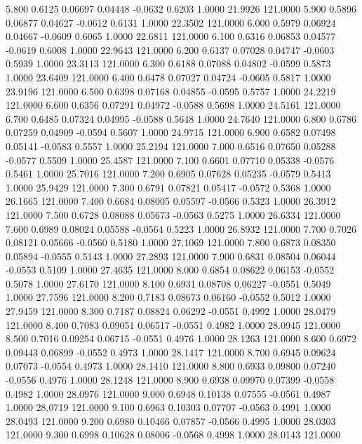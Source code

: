    5.800   0.6125   0.06697   0.04448  -0.0632   0.6203   1.0000  21.9926 121.0000
   5.900   0.5896   0.06877   0.04627  -0.0612   0.6131   1.0000  22.3502 121.0000
   6.000   0.5979   0.06924   0.04667  -0.0609   0.6065   1.0000  22.6811 121.0000
   6.100   0.6316   0.06853   0.04577  -0.0619   0.6008   1.0000  22.9643 121.0000
   6.200   0.6137   0.07028   0.04747  -0.0603   0.5939   1.0000  23.3113 121.0000
   6.300   0.6188   0.07088   0.04802  -0.0599   0.5873   1.0000  23.6409 121.0000
   6.400   0.6478   0.07027   0.04724  -0.0605   0.5817   1.0000  23.9196 121.0000
   6.500   0.6398   0.07168   0.04855  -0.0595   0.5757   1.0000  24.2219 121.0000
   6.600   0.6356   0.07291   0.04972  -0.0588   0.5698   1.0000  24.5161 121.0000
   6.700   0.6485   0.07324   0.04995  -0.0588   0.5648   1.0000  24.7640 121.0000
   6.800   0.6786   0.07259   0.04909  -0.0594   0.5607   1.0000  24.9715 121.0000
   6.900   0.6582   0.07498   0.05141  -0.0583   0.5557   1.0000  25.2194 121.0000
   7.000   0.6516   0.07650   0.05288  -0.0577   0.5509   1.0000  25.4587 121.0000
   7.100   0.6601   0.07710   0.05338  -0.0576   0.5461   1.0000  25.7016 121.0000
   7.200   0.6905   0.07628   0.05235  -0.0579   0.5413   1.0000  25.9429 121.0000
   7.300   0.6791   0.07821   0.05417  -0.0572   0.5368   1.0000  26.1665 121.0000
   7.400   0.6684   0.08005   0.05597  -0.0566   0.5323   1.0000  26.3912 121.0000
   7.500   0.6728   0.08088   0.05673  -0.0563   0.5275   1.0000  26.6334 121.0000
   7.600   0.6989   0.08024   0.05588  -0.0564   0.5223   1.0000  26.8932 121.0000
   7.700   0.7026   0.08121   0.05666  -0.0560   0.5180   1.0000  27.1069 121.0000
   7.800   0.6873   0.08350   0.05894  -0.0555   0.5143   1.0000  27.2893 121.0000
   7.900   0.6831   0.08504   0.06044  -0.0553   0.5109   1.0000  27.4635 121.0000
   8.000   0.6854   0.08622   0.06153  -0.0552   0.5078   1.0000  27.6170 121.0000
   8.100   0.6931   0.08708   0.06227  -0.0551   0.5049   1.0000  27.7596 121.0000
   8.200   0.7183   0.08673   0.06160  -0.0552   0.5012   1.0000  27.9459 121.0000
   8.300   0.7187   0.08824   0.06292  -0.0551   0.4992   1.0000  28.0479 121.0000
   8.400   0.7083   0.09051   0.06517  -0.0551   0.4982   1.0000  28.0945 121.0000
   8.500   0.7016   0.09254   0.06715  -0.0551   0.4976   1.0000  28.1263 121.0000
   8.600   0.6972   0.09443   0.06899  -0.0552   0.4973   1.0000  28.1417 121.0000
   8.700   0.6945   0.09624   0.07073  -0.0554   0.4973   1.0000  28.1410 121.0000
   8.800   0.6933   0.09800   0.07240  -0.0556   0.4976   1.0000  28.1248 121.0000
   8.900   0.6938   0.09970   0.07399  -0.0558   0.4982   1.0000  28.0976 121.0000
   9.000   0.6948   0.10138   0.07555  -0.0561   0.4987   1.0000  28.0719 121.0000
   9.100   0.6963   0.10303   0.07707  -0.0563   0.4991   1.0000  28.0493 121.0000
   9.200   0.6980   0.10466   0.07857  -0.0566   0.4995   1.0000  28.0303 121.0000
   9.300   0.6998   0.10628   0.08006  -0.0568   0.4998   1.0000  28.0143 121.0000
